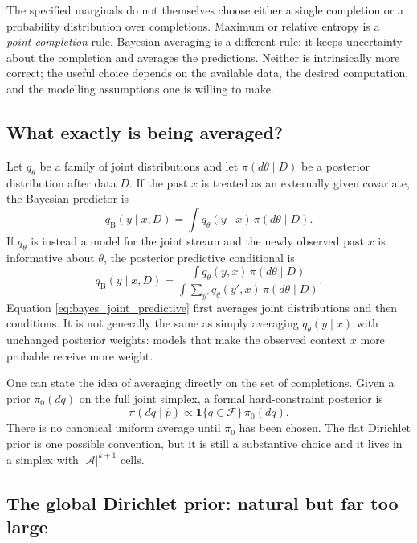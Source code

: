 \documentclass[11pt]{article}
\newcommand{\1}{\mathbf 1}
\newcommand{\mcA}{\mathcal A}
\newcommand{\hatp}{\widehat p}
\begin{document}
The specified marginals do not themselves choose either a single completion or
a probability distribution over completions.  Maximum or relative entropy is a
\emph{point-completion} rule.  Bayesian averaging is a different rule: it
keeps uncertainty about the completion and averages the predictions.
Neither is intrinsically more correct; the useful choice depends on the
available data, the desired computation, and the modelling assumptions one is
willing to make.

\subsection{What exactly is being averaged?}

Let \(q_\theta\) be a family of joint distributions and let
\(\pi(d\theta\mid D)\) be a posterior distribution after data \(D\).  If the
past \(x\) is treated as an externally given covariate, the Bayesian predictor
is
\begin{equation}
  q_{\mathrm B}(y\mid x,D)
  =
  \int q_\theta(y\mid x)\,\pi(d\theta\mid D).
  \label{eq:bayes_conditional}
\end{equation}
If \(q_\theta\) is instead a model for the joint stream and the newly observed
past \(x\) is informative about \(\theta\), the posterior predictive
conditional is
\begin{equation}
  q_{\mathrm B}(y\mid x,D)
  =
  \frac{\displaystyle\int q_\theta(y,x)\,\pi(d\theta\mid D)}
       {\displaystyle\int\sum_{y'}q_\theta(y',x)\,\pi(d\theta\mid D)}.
  \label{eq:bayes_joint_predictive}
\end{equation}
Equation \eqref{eq:bayes_joint_predictive} first averages joint
distributions and then conditions.  It is not generally the same as simply
averaging \(q_\theta(y\mid x)\) with unchanged posterior weights: models that
make the observed context \(x\) more probable receive more weight.

One can state the idea of averaging directly on the set of completions.  Given
a prior \(\pi_0(dq)\) on the full joint simplex, a formal hard-constraint
posterior is
\[
  \pi(dq\mid \hatp)
  \propto
  \mathbf{1}\{q\in\mathcal F\}\,\pi_0(dq).
\]
There is no canonical uniform average until \(\pi_0\) has been chosen.
The flat Dirichlet prior is one possible convention, but it is still a
substantive choice and it lives in a simplex with
\(\lvert\mcA\rvert^{k+1}\) cells.

\subsection{The global Dirichlet prior: natural but far too large}
\end{document}
